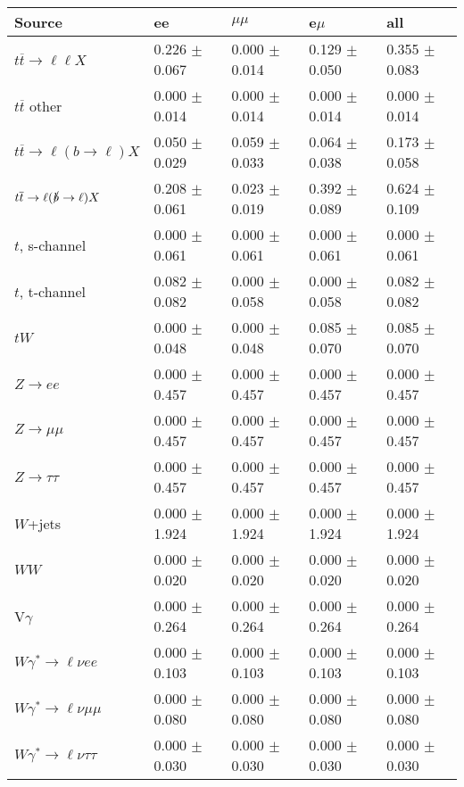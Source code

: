 \begin{tabular}{l | l l l l}
\hline\hline
 Source  &  ee  &  $\mu\mu$  &  e$\mu$  &  all \\
\hline
$t\overline{t}\rightarrow \ell\ell X$ &  0.226 $\pm$  0.067 &  0.000 $\pm$  0.014 &  0.129 $\pm$  0.050 &  0.355 $\pm$  0.083\\
$t\overline{t}$ other &  0.000 $\pm$  0.014 &  0.000 $\pm$  0.014 &  0.000 $\pm$  0.014 &  0.000 $\pm$  0.014\\
$t\overline{t}\rightarrow \ell(b\rightarrow \ell)X$ &  0.050 $\pm$  0.029 &  0.059 $\pm$  0.033 &  0.064 $\pm$  0.038 &  0.173 $\pm$  0.058\\
$t\overline{t}\rightarrow \ell(\slashed{b}\rightarrow \ell)X$ &  0.208 $\pm$  0.061 &  0.023 $\pm$  0.019 &  0.392 $\pm$  0.089 &  0.624 $\pm$  0.109\\
\hline
$t$, s-channel &  0.000 $\pm$  0.061 &  0.000 $\pm$  0.061 &  0.000 $\pm$  0.061 &  0.000 $\pm$  0.061\\
$t$, t-channel &  0.082 $\pm$  0.082 &  0.000 $\pm$  0.058 &  0.000 $\pm$  0.058 &  0.082 $\pm$  0.082\\
$tW$ &  0.000 $\pm$  0.048 &  0.000 $\pm$  0.048 &  0.085 $\pm$  0.070 &  0.085 $\pm$  0.070\\
\hline
$Z\rightarrow ee$ &  0.000 $\pm$  0.457 &  0.000 $\pm$  0.457 &  0.000 $\pm$  0.457 &  0.000 $\pm$  0.457\\
$Z\rightarrow\mu\mu$ &  0.000 $\pm$  0.457 &  0.000 $\pm$  0.457 &  0.000 $\pm$  0.457 &  0.000 $\pm$  0.457\\
$Z\rightarrow\tau\tau$ &  0.000 $\pm$  0.457 &  0.000 $\pm$  0.457 &  0.000 $\pm$  0.457 &  0.000 $\pm$  0.457\\
$W$+jets &  0.000 $\pm$  1.924 &  0.000 $\pm$  1.924 &  0.000 $\pm$  1.924 &  0.000 $\pm$  1.924\\
$WW$ &  0.000 $\pm$  0.020 &  0.000 $\pm$  0.020 &  0.000 $\pm$  0.020 &  0.000 $\pm$  0.020\\
\hline
V$\gamma$ &  0.000 $\pm$  0.264 &  0.000 $\pm$  0.264 &  0.000 $\pm$  0.264 &  0.000 $\pm$  0.264\\
$W\gamma^{*}\rightarrow\ell\nu e e$ &  0.000 $\pm$  0.103 &  0.000 $\pm$  0.103 &  0.000 $\pm$  0.103 &  0.000 $\pm$  0.103\\
$W\gamma^{*}\rightarrow\ell\nu\mu\mu$ &  0.000 $\pm$  0.080 &  0.000 $\pm$  0.080 &  0.000 $\pm$  0.080 &  0.000 $\pm$  0.080\\
$W\gamma^{*}\rightarrow\ell\nu\tau\tau$ &  0.000 $\pm$  0.030 &  0.000 $\pm$  0.030 &  0.000 $\pm$  0.030 &  0.000 $\pm$  0.030\\

\end{tabular}
